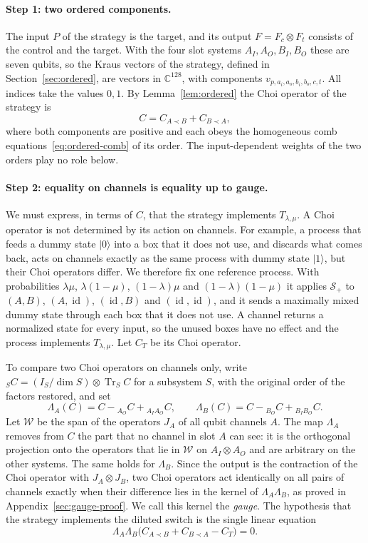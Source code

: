 \documentclass[11pt,letterpaper]{article}
\theoremstyle{definition}\newtheorem{definition}[theorem]{Definition}
\newcommand{\C}{\mathbb C}
\newcommand{\Tr}{\operatorname{Tr}}
\newcommand{\ket}[1]{\lvert#1\rangle}
\newcommand{\SW}{\mathcal S}
\newcommand{\id}{\operatorname{id}}
\newcommand{\before}{\prec}
\begin{document}
\paragraph{Step 1: two ordered components.}
The input $P$ of the strategy is the target, and its output
$F=F_c\otimes F_t$ consists of the control and the target. With the
four slot systems $A_I,A_O,B_I,B_O$ these are seven qubits, so the
Kraus vectors of the strategy, defined in Section~\ref{sec:ordered}, are vectors in $\C^{128}$,
with components $v_{p,a_i,a_o,b_i,b_o,c,t}$. All indices take the
values $0,1$. By Lemma~\ref{lem:ordered}
the Choi operator of the strategy is
\[
 C=C_{A\before B}+C_{B\before A},
\]
where both components are positive and each obeys the homogeneous comb
equations~\eqref{eq:ordered-comb} of its order. The input-dependent
weights of the two orders play no role below.

\paragraph{Step 2: equality on channels is equality up to gauge.}
We must express, in terms of $C$, that the strategy implements
$T_{\lambda,\mu}$. A Choi operator is not determined by its action on
channels. For example, a process that feeds a dummy state $\ket0$ into
a box that it does not use, and discards what comes back, acts on
channels exactly as the same process with dummy state $\ket1$, but
their Choi operators differ. We therefore fix one reference process.
With probabilities $\lambda\mu$, $\lambda(1-\mu)$, $(1-\lambda)\mu$ and
$(1-\lambda)(1-\mu)$ it applies $\SW_+$ to $(A,B)$, $(A,\id)$,
$(\id,B)$ and $(\id,\id)$, and it sends a maximally mixed dummy state
through each box that it does not use. A channel returns a normalized
state for every input, so the unused boxes have no effect and the
process implements $T_{\lambda,\mu}$. Let $C_T$ be its Choi operator.

To compare two Choi operators on channels only, write
${}_SC=(I_S/\dim S)\otimes\Tr_SC$ for a subsystem $S$, with the
original order of the factors restored, and set
\[
 \Lambda_A(C)=C-{}_{A_O}C+{}_{A_IA_O}C,\qquad
 \Lambda_B(C)=C-{}_{B_O}C+{}_{B_IB_O}C .
\]
Let $\mathcal W$ be the span of the operators $J_A$ of all qubit
channels $A$. The map $\Lambda_A$ removes from $C$ the part that no
channel in slot $A$ can see: it is the orthogonal projection onto the
operators that lie in $\mathcal W$ on $A_I\otimes A_O$ and are
arbitrary on the other systems. The same holds for $\Lambda_B$. Since the
output is the contraction of the Choi operator with $J_A\otimes J_B$,
two Choi operators act identically on all pairs of channels exactly
when their difference lies in the kernel of $\Lambda_A\Lambda_B$,
as proved in Appendix~\ref{sec:gauge-proof}. We call this kernel the \emph{gauge}.
The hypothesis that the strategy implements the diluted switch is the single linear equation
\begin{equation}\label{eq:gauge-equation}
 \Lambda_A\Lambda_B\bigl(C_{A\before B}+C_{B\before A}-C_T\bigr)=0 .
\end{equation}
\end{document}
